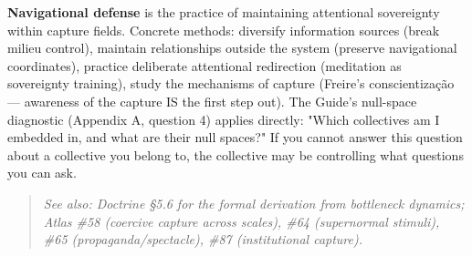 \textbf{Navigational defense} is the practice of maintaining attentional sovereignty within capture fields. Concrete methods: diversify information sources (break milieu control), maintain relationships outside the system (preserve navigational coordinates), practice deliberate attentional redirection (meditation as sovereignty training), study the mechanisms of capture (Freire's conscientização — awareness of the capture IS the first step out). The Guide's null-space diagnostic (Appendix A, question 4) applies directly: "Which collectives am I embedded in, and what are their null spaces?" If you cannot answer this question about a collective you belong to, the collective may be controlling what questions you can ask.


\begin{quote}
\itshape
\textit{See also: Doctrine §5.6 for the formal derivation from bottleneck dynamics; Atlas \#58 (coercive capture across scales), \#64 (supernormal stimuli), \#65 (propaganda/\allowbreak spectacle), \#87 (institutional capture).}
\end{quote}


\bigskip\noindent\makebox[\textwidth]{\color{rulegray}\rule{5cm}{0.3pt}}\bigskip
